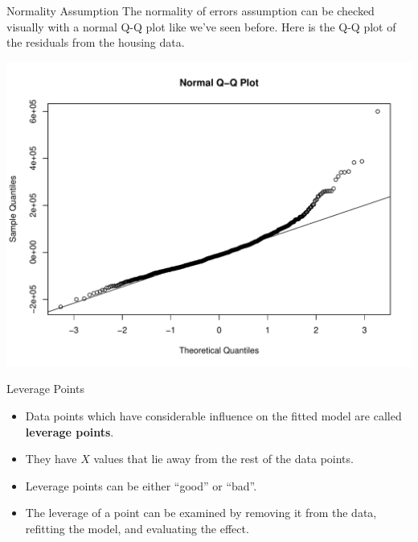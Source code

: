 \documentclass{beamer}
\begin{document}
\begin{frame}{Normality Assumption}
    The normality of errors assumption can be checked visually with a normal Q-Q plot like we've seen before. Here is the Q-Q plot of the residuals from the housing data.
    \begin{center}
        \includegraphics[width=.8\linewidth]{figures/housing-qq.pdf}
    \end{center}
\end{frame}

\begin{frame}{Leverage Points}
    \begin{itemize}
        \item Data points which have considerable influence on the fitted model are called \textbf{leverage points}. 
        \item They have $X$ values that lie away from the rest of the data points. 
        \item Leverage points can be either ``good'' or ``bad''.
        \item The leverage of a point can be examined by removing it from the data, refitting the model, and evaluating the effect. 
    \end{itemize}
\end{frame}
\end{document}
